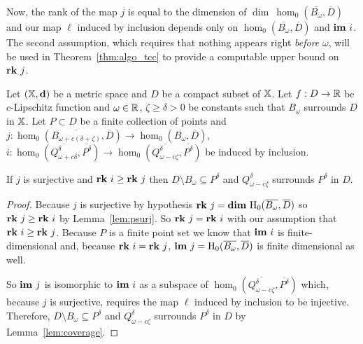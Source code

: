 Now, the rank of the map $j$ is equal to the dimension of $\dim~\hom_0(\overline{B_\omega}, \overline{D})$ and our map $\ell$ induced by inclusion depends only on $\hom_0(\overline{B_\omega}, \overline{D})$ and $\mathbf{im}~i$.
The second assumption, which requires that nothing appears right \emph{before} $\omega$, will be used in Theorem~\ref{thm:algo_tcc} to provide a computable upper bound on $\mathbf{rk}~j$.

\begin{theorem}\label{thm:geo_tcc}
  Let $(\mathbb{X},\mathbf{d})$ be a metric space and $D$ be a compact subset of $\mathbb{X}$.
  Let $f : D\to\mathbb{R}$ be $c$-Lipschitz function and $\omega\in\mathbb{R}$, $\zeta\geq\delta > 0$ be constants such that $B_{\omega}$ surrounds $D$ in $\mathbb{X}$.
  Let $P\subset D$ be a finite collection of points and $j : \hom_0(\overline{B_{\omega+c(\delta+\zeta)}},\overline{D})\to \hom_0(\overline{B_{\omega}},\overline{D})$, $i : \hom_0(\overline{Q_{\omega+c\delta}^\delta}, \overline{P^\delta})\to \hom_0(\overline{Q_{\omega-c\zeta}^\delta}, \overline{P^\delta})$ be induced by inclusion.

  If $j$ is surjective and $\mathbf{rk}~i\geq \mathbf{rk}~j$ then $D\setminus B_{\omega}\subseteq P^\delta$ and $Q_{\omega-c\zeta}^\delta$ surrounds $P^\delta$ in $D$.
\end{theorem}
\begin{proof}
  Because $j$ is surjective by hypothesis $\mathbf{rk}~j = \mathbf{dim}~\mathrm{H}_0(\overline{B_{\omega}},\overline{D})$ so $\mathbf{rk}~j\geq \mathbf{rk}~i$ by Lemma~\ref{lem:psurj}.
  So $\mathbf{rk}~j = \mathbf{rk}~i$ with our assumption that $\mathbf{rk}~i\geq \mathbf{rk}~j$.
  Because $P$ is a finite point set we know that $\mathbf{im}~i$ is finite-dimensional and, because $\mathbf{rk}~i = \mathbf{rk}~j$, $\mathbf{im}~j=\mathrm{H}_0(\overline{B_{\omega}}, \overline{D})$ is finite dimensional as well.

  So $\mathbf{im}~j$ is isomorphic to $\mathbf{im}~i$ as a subspace of $\hom_0(\overline{Q_{\omega-c\zeta}^\delta}, \overline{P^\delta})$ which, because $j$ is surjective, requires the map $\ell$ induced by inclusion to be injective.
  Therefore, $D\setminus B_{\omega}\subseteq P^\delta$ and $Q_{\omega-c\zeta}^\delta$ surrounds $P^\delta$ in $D$ by Lemma~\ref{lem:coverage}. %
\end{proof}
